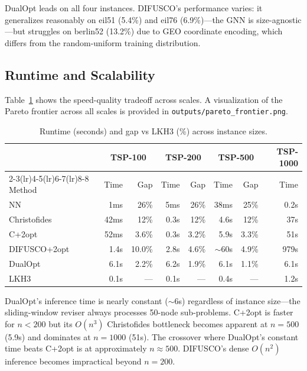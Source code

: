 \documentclass[11pt,a4paper]{article}
\begin{document}
DualOpt leads on all four instances. DIFUSCO's performance varies: it generalizes reasonably on eil51 (5.4\%) and eil76 (6.9\%)---the GNN is size-agnostic---but struggles on berlin52 (13.2\%) due to GEO coordinate encoding, which differs from the random-uniform training distribution.

\subsection{Runtime and Scalability}

Table~\ref{tab:scaling} shows the speed-quality tradeoff across scales. A visualization of the Pareto frontier across all scales is provided in \texttt{outputs/pareto\_frontier.png}.

\begin{table}[H]
\centering
\footnotesize
\caption{Runtime (seconds) and gap vs LKH3 (\%) across instance sizes.}
\label{tab:scaling}
\begin{tabular}{@{}lrrrrrrr@{}}
\toprule
& \multicolumn{2}{c}{TSP-100} & \multicolumn{2}{c}{TSP-200} & \multicolumn{2}{c}{TSP-500} & TSP-1000 \\
\cmidrule(lr){2-3}\cmidrule(lr){4-5}\cmidrule(lr){6-7}\cmidrule(lr){8-8}
Method & Time & Gap & Time & Gap & Time & Gap & Time \\
\midrule
NN & 1ms & 26\% & 5ms & 26\% & 38ms & 25\% & 0.2s \\
Christofides & 42ms & 12\% & 0.3s & 12\% & 4.6s & 12\% & 37s \\
C+2opt & 52ms & 3.6\% & 0.3s & 3.2\% & 5.9s & 3.3\% & 51s \\
DIFUSCO+2opt & 1.4s & 10.0\% & 2.8s & 4.6\% & $\sim$60s & 4.9\% & 979s \\
DualOpt & 6.1s & 2.2\% & 6.2s & 1.9\% & 6.1s & 1.1\% & 6.1s \\
LKH3 & 0.1s & --- & 0.1s & --- & 0.4s & --- & 1.2s \\
\bottomrule
\end{tabular}
\end{table}

DualOpt's inference time is nearly constant ($\sim$6s) regardless of instance size---the sliding-window reviser always processes 50-node sub-problems. C+2opt is faster for $n < 200$ but its $O(n^3)$ Christofides bottleneck becomes apparent at $n=500$ (5.9s) and dominates at $n=1000$ (51s). The crossover where DualOpt's constant time beats C+2opt is at approximately $n \approx 500$. DIFUSCO's dense $O(n^2)$ inference becomes impractical beyond $n=200$.
\end{document}
